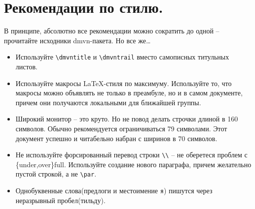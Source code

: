 \section{Рекомендации по стилю.}
В принципе, абсолютно все рекомендации можно сократить до одной --
прочитайте исходники dmvn-пакета. Но все же…
\begin{itemize}
\item Используйте \verb'\dmvntitle' и \verb'\dmvntrail' 
  вместо самописных титульных листов. 
\item Используйте макросы LaTeX-стиля по максимуму. Используйте то,
  что макросы можно объявлять не только в преамбуле, но и в самом
  документе, причем они получаются локальными для ближайшей группы.
\item Широкий монитор -- это круто. Но не повод делать строчки длиной
  в 160 символов. Обычно рекомендуется ограничиваться 79 символами.
  Этот документ успешно и читабельно набран с ширинов в 70 символов.
\item Не используйте форсированный перевод строки \verb'\\' -- не
  оберетеся проблем с \{under,over\}full. Используйте создание нового
  параграфа, причем желательно пустой строкой, а не \verb'\par'.
\item Однобуквенные слова(предлоги и местоимение {\tt я}) пишутся через неразрывный пробел(тильду).

\end{itemize}
